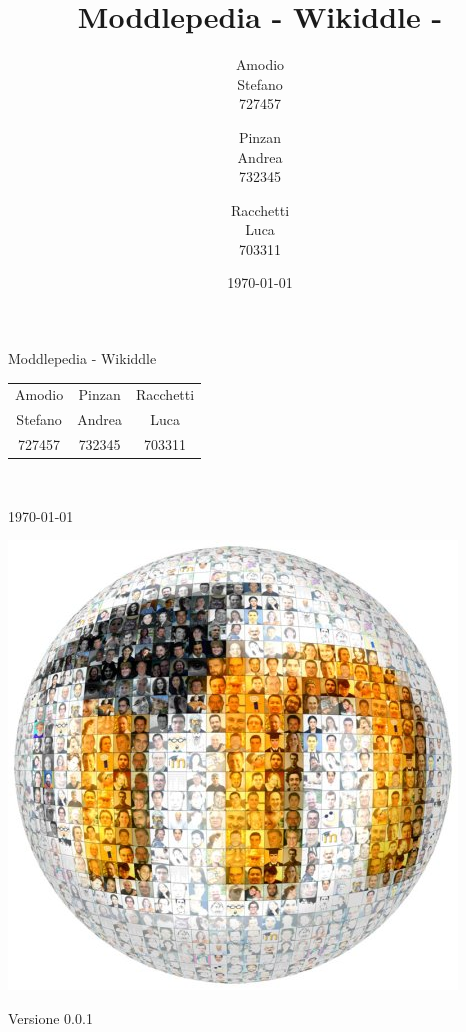 \documentclass[12pt,a4paper,oneside]{article} %
\title{Moddlepedia - Wikiddle - }
\author{Amodio\\Stefano\\727457
\and Pinzan\\Andrea\\732345
\and Racchetti\\Luca\\703311}
\date{\today}
\begin{document}


\begin{titlepage}
\begin{center}
		\Huge{Moddlepedia - Wikiddle}\\
	\vskip 20pt
	\begin{Large}
		\begin{tabular}{ c c c }
		  Amodio & Pinzan & Racchetti \\
		  Stefano & Andrea & Luca \\
		  727457 & 732345 & 703311 \\
		\end{tabular}
	\end{Large}\\
	\vskip 20pt
		\begin{normalsize}
			\today\\
		\end{normalsize}
	\vfill
		\includegraphics[scale=0.8]{Immagini/logo.jpg}
	\vfill
	\begin{normalsize}
		Versione 0.0.1	
	\end{normalsize}
\end{center}
\end{titlepage}
\end{document}

